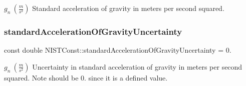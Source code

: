 $g_n \ (\frac{m}{s^2})$ Standard acceleration of gravity in meters per second squared. \mbox{\label{group___gravity_acceleration_gaabc6df92c25677a5b767445f101d4f57}} 
\subsubsection{\texorpdfstring{standard\+Acceleration\+Of\+Gravity\+Uncertainty}{standardAccelerationOfGravityUncertainty}}
{\footnotesize\ttfamily const double N\+I\+S\+T\+Const\+::standard\+Acceleration\+Of\+Gravity\+Uncertainty = 0.}

$g_n \ (\frac{m}{s^2})$ Uncertainty in standard acceleration of gravity in meters per second squared. Note should be 0. since it is a defined value. 